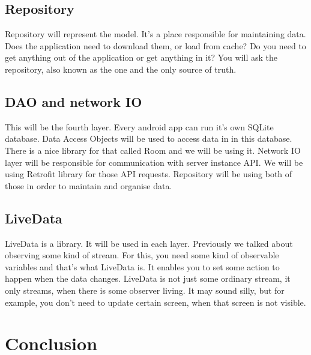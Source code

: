 \subsection{Repository}
Repository will represent the model.
It's a place responsible for maintaining data.
Does the application need to download them, or load from cache?
Do you need to get anything out of the application or get anything in it?
You will ask the repository, also known as the one and the only source of truth.

\subsection{DAO and network IO}
This will be the fourth layer.
Every android app can run it's own SQLite database.
Data Access Objects will be used to access data in in this database.
There is a nice library for that called Room and we will be using it.
Network IO layer will be responsible for communication with server instance API.
We will be using Retrofit library for those API requests.
Repository will be using both of those in order to maintain and organise data.

\subsection{LiveData}
LiveData is a library.
It will be used in each layer.
Previously we talked about observing some kind of stream.
For this, you need some kind of observable variables and that's what LiveData is.
It enables you to set some action to happen when the data changes.
LiveData is not just some ordinary stream, it only streams, when there is some observer living.
It may sound silly, but for example, you don't need to update certain screen, when that screen is not visible.

\section{Conclusion}

